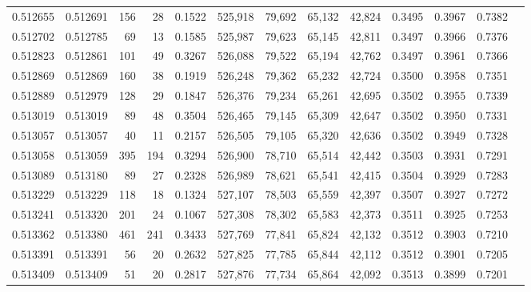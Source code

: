 \begin{tabular}{rrrrrrrrrrrrr}
0.512655 & 0.512691 &   156 &    28 &                                     0.1522 & 525,918 &  79,692 &  65,132 &  42,824 & 0.3495 & 0.3967 & 0.7382 \\
0.512702 & 0.512785 &    69 &    13 &                                     0.1585 & 525,987 &  79,623 &  65,145 &  42,811 & 0.3497 & 0.3966 & 0.7376 \\
0.512823 & 0.512861 &   101 &    49 &                                     0.3267 & 526,088 &  79,522 &  65,194 &  42,762 & 0.3497 & 0.3961 & 0.7366 \\
0.512869 & 0.512869 &   160 &    38 &                                     0.1919 & 526,248 &  79,362 &  65,232 &  42,724 & 0.3500 & 0.3958 & 0.7351 \\
0.512889 & 0.512979 &   128 &    29 &                                     0.1847 & 526,376 &  79,234 &  65,261 &  42,695 & 0.3502 & 0.3955 & 0.7339 \\
0.513019 & 0.513019 &    89 &    48 &                                     0.3504 & 526,465 &  79,145 &  65,309 &  42,647 & 0.3502 & 0.3950 & 0.7331 \\
0.513057 & 0.513057 &    40 &    11 &                                     0.2157 & 526,505 &  79,105 &  65,320 &  42,636 & 0.3502 & 0.3949 & 0.7328 \\
0.513058 & 0.513059 &   395 &   194 &                                     0.3294 & 526,900 &  78,710 &  65,514 &  42,442 & 0.3503 & 0.3931 & 0.7291 \\
0.513089 & 0.513180 &    89 &    27 &                                     0.2328 & 526,989 &  78,621 &  65,541 &  42,415 & 0.3504 & 0.3929 & 0.7283 \\
0.513229 & 0.513229 &   118 &    18 &                                     0.1324 & 527,107 &  78,503 &  65,559 &  42,397 & 0.3507 & 0.3927 & 0.7272 \\
0.513241 & 0.513320 &   201 &    24 &                                     0.1067 & 527,308 &  78,302 &  65,583 &  42,373 & 0.3511 & 0.3925 & 0.7253 \\
0.513362 & 0.513380 &   461 &   241 &                                     0.3433 & 527,769 &  77,841 &  65,824 &  42,132 & 0.3512 & 0.3903 & 0.7210 \\
0.513391 & 0.513391 &    56 &    20 &                                     0.2632 & 527,825 &  77,785 &  65,844 &  42,112 & 0.3512 & 0.3901 & 0.7205 \\
0.513409 & 0.513409 &    51 &    20 &                                     0.2817 & 527,876 &  77,734 &  65,864 &  42,092 & 0.3513 & 0.3899 & 0.7201 \\

\end{tabular}
